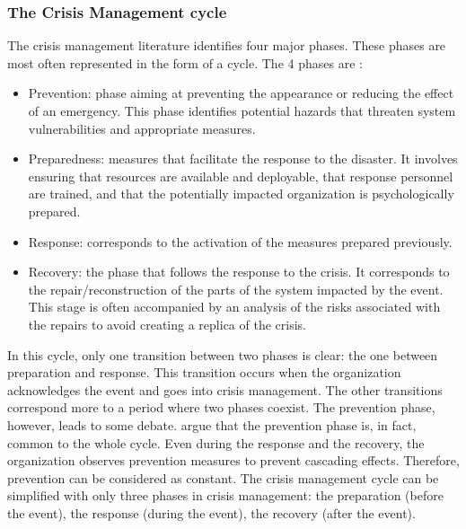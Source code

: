 \subsubsection{The Crisis Management cycle}
The crisis management literature identifies four major phases.
These phases are most often represented in the form of a cycle.
The 4 phases are :

\begin{itemize}
    \item Prevention: phase aiming at preventing the appearance or reducing the effect of an emergency.
          This phase identifies potential hazards that threaten system vulnerabilities and appropriate measures.
    \item Preparedness: measures that facilitate the response to the disaster. It involves ensuring that resources are available and deployable, that response personnel are trained, and that the potentially impacted organization is psychologically prepared.
    \item Response: corresponds to the activation of the measures prepared previously.
    \item Recovery: the phase that follows the response to the crisis. It corresponds to the repair/reconstruction of the parts of the system impacted by the event.
          This stage is often accompanied by an analysis of the risks associated with the repairs to avoid creating a replica of the crisis.
\end{itemize}

In this cycle, only one transition between two phases is clear: the one between preparation and response.
This transition occurs when the organization acknowledges the event and goes into crisis management.
The other transitions correspond more to a period where two phases coexist.
The prevention phase, however, leads to some debate.
\textcite{benabenCollaborativeSystemsCrisis2014} argue that the prevention phase is, in fact, common to the whole cycle.
Even during the response and the recovery, the organization observes prevention measures to prevent cascading effects.
Therefore, prevention can be considered as constant.
The crisis management cycle can be simplified with only three phases in crisis management: the preparation (before the event), the response (during the event), the recovery (after the event).

